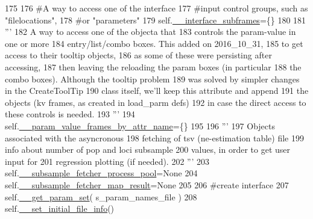 \begin{DoxyCode}
175 
176         \textcolor{comment}{#A way to access one of the interface}
177         \textcolor{comment}{#input control groups, such as "filelocations",}
178         \textcolor{comment}{#or "parameters"}
179         self.\hyperlink{classnegui_1_1pgguiviz_1_1PGGuiViz_abfe9238ef475cd16f880a21834a08c7a}{\_\_interface\_subframes}=\{\}
180 
181         \textcolor{stringliteral}{'''}
182 \textcolor{stringliteral}{        A way to access one of the objecta that}
183 \textcolor{stringliteral}{        controls the param-value in one or more }
184 \textcolor{stringliteral}{        entry/list/combo boxes.  This added on 2016\_10\_31, }
185 \textcolor{stringliteral}{        to get access to their tooltip objects,         }
186 \textcolor{stringliteral}{        as some of these were persisting after accessing,}
187 \textcolor{stringliteral}{        then leaving the reloading the param boxes (in particular}
188 \textcolor{stringliteral}{        the combo boxes). Although the tooltip problem}
189 \textcolor{stringliteral}{        was solved by simpler changes in the CreateToolTip}
190 \textcolor{stringliteral}{        class itself, we'll keep this attribute and append}
191 \textcolor{stringliteral}{        the objects (kv frames, as created in load\_parm defs)}
192 \textcolor{stringliteral}{        in case the direct access to these controls is needed.}
193 \textcolor{stringliteral}{        '''}
194         self.\hyperlink{classnegui_1_1pgguiviz_1_1PGGuiViz_a2e6db852b710f29e858d43291471c0e6}{\_\_param\_value\_frames\_by\_attr\_name}=\{\}
195 
196         \textcolor{stringliteral}{'''}
197 \textcolor{stringliteral}{        Objects associated with the asyncronous}
198 \textcolor{stringliteral}{        fetching of tsv (ne-estimation table) file}
199 \textcolor{stringliteral}{        info about number of pop and loci subsample}
200 \textcolor{stringliteral}{        values, in order to get user input for}
201 \textcolor{stringliteral}{        regression plotting (if needed).}
202 \textcolor{stringliteral}{        '''}
203         self.\hyperlink{classnegui_1_1pgguiviz_1_1PGGuiViz_a97a073c724f2714a2c12133f4280de7a}{\_\_subsample\_fetcher\_process\_pool}=\textcolor{keywordtype}{None}
204         self.\hyperlink{classnegui_1_1pgguiviz_1_1PGGuiViz_a70888e0afd46435e2adbee5a6d169a05}{\_\_subsample\_fetcher\_map\_result}=\textcolor{keywordtype}{None}
205 
206         \textcolor{comment}{#create interface}
207         self.\hyperlink{classnegui_1_1pgguiviz_1_1PGGuiViz_af015d3d20404d46327e7013e74bc409e}{\_\_get\_param\_set}( s\_param\_names\_file )
208         self.\hyperlink{classnegui_1_1pgguiviz_1_1PGGuiViz_a012371f2fae3b89f2daff29c36a9f19d}{\_\_set\_initial\_file\_info}()

\end{DoxyCode}
